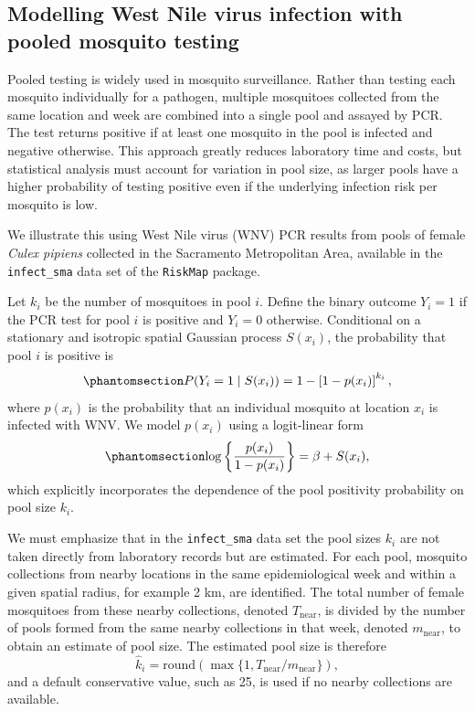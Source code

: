 \documentclass[
  letterpaper,
]{krantz}
\begin{document}
\subsection{Modelling West Nile virus infection with pooled mosquito
testing}\label{sec-wnv-model}

Pooled testing is widely used in mosquito surveillance. Rather than
testing each mosquito individually for a pathogen, multiple mosquitoes
collected from the same location and week are combined into a single
pool and assayed by PCR. The test returns positive if at least one
mosquito in the pool is infected and negative otherwise. This approach
greatly reduces laboratory time and costs, but statistical analysis must
account for variation in pool size, as larger pools have a higher
probability of testing positive even if the underlying infection risk
per mosquito is low.

We illustrate this using West Nile virus (WNV) PCR results from pools of
female \emph{Culex pipiens} collected in the Sacramento Metropolitan
Area, available in the \texttt{infect\_sma} data set of the
\texttt{RiskMap} package.

Let \(k_i\) be the number of mosquitoes in pool \(i\). Define the binary
outcome \(Y_i=1\) if the PCR test for pool \(i\) is positive and
\(Y_i=0\) otherwise. Conditional on a stationary and isotropic spatial
Gaussian process \(S(x_i)\), the probability that pool \(i\) is positive
is\\
\begin{equation}\phantomsection\label{eq-wnv-pos-model}{
P(Y_i=1\mid S(x_i))=1-\left[1-p(x_i)\right]^{k_i},
}\end{equation} where \(p(x_i)\) is the probability that an individual
mosquito at location \(x_i\) is infected with WNV. We model \(p(x_i)\)
using a logit-linear form\\
\begin{equation}\phantomsection\label{eq-wnv-lp}{
\log\left\{\frac{p(x_i)}{1-p(x_i)}\right\}=\beta+S(x_i),
}\end{equation} which explicitly incorporates the dependence of the pool
positivity probability on pool size \(k_i\).

We must emphasize that in the \texttt{infect\_sma} data set the pool
sizes \(k_i\) are not taken directly from laboratory records but are
estimated. For each pool, mosquito collections from nearby locations in
the same epidemiological week and within a given spatial radius, for
example 2 km, are identified. The total number of female mosquitoes from
these nearby collections, denoted \(T_{\text{near}}\), is divided by the
number of pools formed from the same nearby collections in that week,
denoted \(m_{\text{near}}\), to obtain an estimate of pool size. The
estimated pool size is therefore\\
\[
\widehat{k}_i=\text{round}\left(\max\{1,T_{\text{near}}/m_{\text{near}}\}\right),
\] and a default conservative value, such as 25, is used if no nearby
collections are available.
\end{document}

